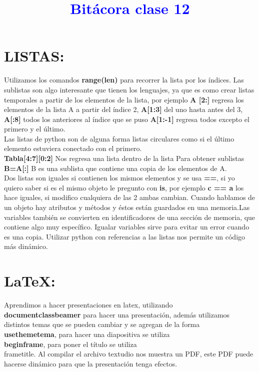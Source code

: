 \documentclass{book}
\begin{document}
	\begin{center}
		\title {\textcolor{blue}{\Huge \textbf{Bitácora clase 12}} }  
	\end{center}
	
	
	\section*{LISTAS:}
	
	Utilizamos los comandos \textbf{range(len)} para recorrer la lista por los índices. 
	Las sublistas son algo interesante que tienen los lenguajes, ya que es como crear listas temporales a partir de los elementos de la lista, por ejemplo \textbf{A [2:]}  regresa los elementos de la lista A a partir del índice 2, \textbf{A[1:3]} del uno hasta antes del 3, \textbf{A[:8]} todos los anteriores al índice que se puso \textbf{A[1:-1]} regresa todos excepto el primero y el último.\\
	Las listas de python son de alguna forma listas circulares como si el último elemento estuviera conectado con el primero. \\
	\textbf{Tabla[4:7][0:2]} Nos regresa una lista dentro de la lista
	Para obtener sublistas\textbf{ B=A[:]} B es una sublista que contiene una copia de los elementos de A.\\
	Dos listas son iguales si contienen los mismos elementos y se usa \textbf{==}, si yo quiero saber si es el mismo objeto le pregunto con \textbf{is}, por ejemplo \textbf{c == a} los hace iguales, si modifico cualquiera de las 2 ambas cambian. 
	Cuando hablamos de un objeto hay atributos y métodos y éstos están guardados en una memoria.Las variables también se convierten en identificadores de una sección de memoria, que contiene algo muy específico. Igualar variables sirve para evitar un error cuando es una copia. Utilizar python con referencias a las listas nos permite un código más dinámico.
	\section*{LaTeX:}
	Aprendimos a hacer presentaciones en latex, utilizando\textbf{\\documentclass{beamer}} para hacer una presentación, además utilizamos distintos temas que se pueden cambiar y se agregan de la forma \textbf{\\usetheme{tema}}, para hacer una diapositiva se utiliza \textbf{\\begin{frame}}, para poner el título se utiliza \\frametitle. Al compilar el archivo textudio nos muestra un PDF, este PDF puede hacerse dinámico para que la presentación tenga efectos. 
	
\end{document}
